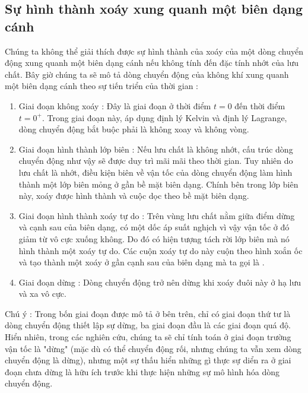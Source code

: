 \documentclass[KHI_DONG_HOC.tex]{subfiles}
\begin{document}
		\leftskip=1cm
		\rightskip=1cm
			
			
		\leftskip=0cm
		\rightskip=0cm


\subsection{Sự hình thành xoáy xung quanh một biên dạng cánh}

Chúng ta không thể giải thích được sự hình thành của xoáy của một dòng chuyển động xung quanh một biên dạng cánh nếu không tính đến đặc tính nhớt của lưu chất. Bây giờ chúng ta sẽ mô tả dòng chuyển động của không khí xung quanh một biên dạng cánh theo sự tiến triển của thời gian :
\begin{enumerate}
	\item{Giai đoạn không xoáy :} Đây là giai đoạn ở thời điểm $t=0$ đến thời điểm $t=0^+$. Trong giai đoạn này, áp dụng định lý Kelvin và định lý Lagrange, dòng chuyển động bắt buộc phải là không xoay và không vòng.
	\item{Giai đoạn hình thành lớp biên :} Nếu lưu chất là không nhớt, cấu trúc dòng chuyển động như vậy sẽ được duy trì mãi mãi theo thời gian. Tuy nhiên do lưu chất là nhớt, điều kiện biên về vận tốc của dòng chuyển động làm hình thành một lớp biên mỏng ở gần bề mặt biên dạng. Chính bên trong lớp biên này, xoáy được hình thành và cuộc dọc theo bề mặt biên dạng.
	\item{Giai đoạn hình thành xoáy tự do :} Trên vùng lưu chất nằm giữa điểm dừng và cạnh sau của biên dạng, có một dốc áp suất nghịch vì vậy vận tốc ở đó giảm từ vô cực xuống không. Do đó có hiện tượng tách rời lớp biên mà nó hình thành một xoáy tự do. Các cuộn xoáy tự do này cuộn theo hình xoắn ốc và tạo thành một xoáy ở gần cạnh sau của biên dạng mà ta gọi là .
	\item{Giai đoạn dừng :} Dòng chuyển động trở nên dừng khi xoáy đuôi này ở hạ lưu và xa vô cực.
\end{enumerate}

\begin{description}
	\item{Chú ý :} Trong bốn giai đoạn được mô tả ở bên trên, chỉ có giai đoạn thứ tư là dòng chuyển động thiết lập sự dừng, ba giai đoạn đầu là các giai đoạn quá độ. Hiển nhiên, trong các nghiên cứu, chúng ta sẽ chỉ tính toán ở giai đoạn trường vận tốc là "dừng" (mặc dù có thể chuyển động rối, nhưng chúng ta vẫn xem dòng chuyển động là dừng), nhưng một sự thấu hiển những gì thực sự diển ra ở giai đoạn chưa dừng là hữu ích trước khi thực hiện những sự mô hình hóa dòng chuyển động.
\end{description}
\end{document}
